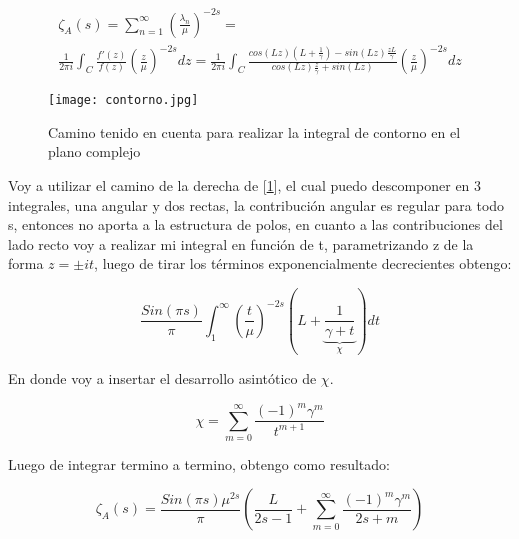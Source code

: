 \begin{equation}
\begin{array}{c}
   \zeta _A (s) =  \sum _{n=1} ^{\infty} \left( \frac{\lambda _n}{\mu} \right) ^{-2s} = \\ 
   \frac{1}{2 \pi i} \int _{C} \frac{f'(z)}{f(z)} \left( \frac{z}{\mu} \right) ^{-2s} dz =  
    \frac{1}{2 \pi i} \int _{C}
    \frac{ cos(L z) \left(L + \frac{1}{\gamma} \right) - sin(L z) \frac{z L}{\gamma}
    }
    {cos(L z) \frac{z}{\gamma} + sin(L z)
    }
    \left( \frac{z}{\mu} \right) ^{-2 s} dz
\end{array}
\label{asd}
\end{equation}


\begin{figure}
\centering
\texttt{[image: contorno.jpg]}
\caption{Camino tenido en cuenta para realizar la integral de contorno en el plano complejo}
\label{fig:contorno}
\end{figure}


Voy a utilizar el camino de la derecha de [\ref{fig:contorno}], el cual puedo descomponer en 3 integrales, una angular y dos rectas, la contribución angular es regular para todo s, entonces no aporta a la estructura de polos, en cuanto a las contribuciones del lado recto voy a realizar mi integral en función de t, parametrizando z de la forma $z = \pm i  t$, luego de tirar los términos exponencialmente decrecientes obtengo:

\begin{equation}
    \frac{Sin(\pi s)}{ \pi } 
    \int _1 ^{\infty} 
    \left( \frac{t}{\mu}  \right)^{-2s}
    \left(
    	L + 
	    \underbrace
    	{
		\frac{1}{\gamma + t}   
		} _{\chi} 
	\right)
    dt 
\label{contorno}
\end{equation}

En donde voy a insertar el desarrollo asintótico de   $\chi$. 

\begin{equation}
    \chi =   \sum _{m=0} ^{\infty} \frac{(-1) ^{m} \gamma ^{m} }{t ^{m+1}}
\label{eq:chi}
\end{equation}

Luego de integrar termino a termino, obtengo como resultado:

\begin{equation}
    \zeta _A (s) = 
    \frac{Sin(\pi s) \mu ^{2s }}{\pi } 
    \left(
    \frac{L}{2s-1} + 
    \sum _{m=0} ^{\infty}
    \frac{(-1) ^{m} \gamma ^{m} }{2s+m}
    \right)
\label{eq.zeta.com}
\end{equation}

